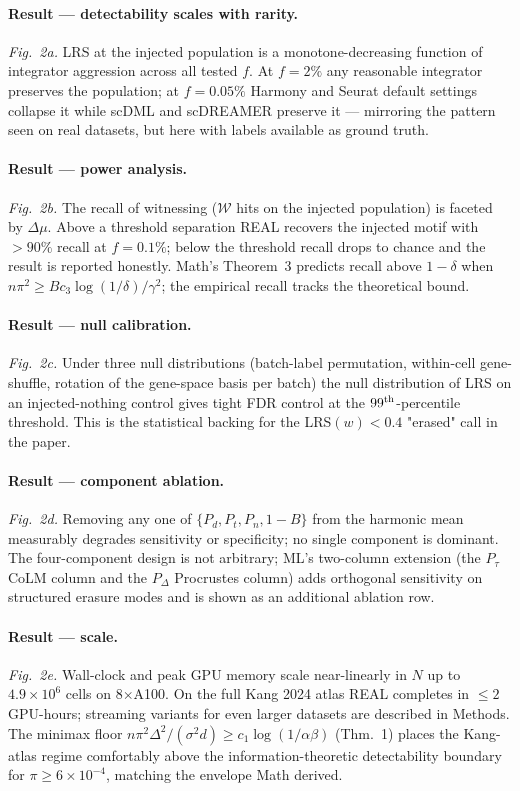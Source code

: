 \paragraph{Result --- detectability scales with rarity.} \emph{Fig.~2a.}  LRS at the injected population is a monotone-decreasing function of integrator aggression across all tested $f$.  At $f=2\%$ any reasonable integrator preserves the population; at $f=0.05\%$ Harmony and Seurat default settings collapse it while scDML and scDREAMER preserve it --- mirroring the pattern seen on real datasets, but here with labels available as ground truth.

\paragraph{Result --- power analysis.} \emph{Fig.~2b.}  The recall of witnessing ($\mathcal{W}$ hits on the injected population) is faceted by $\Delta\mu$.  Above a threshold separation REAL recovers the injected motif with $>90\%$ recall at $f=0.1\%$; below the threshold recall drops to chance and the result is reported honestly.  Math's Theorem~3 predicts recall above $1-\delta$ when $n\pi^2 \ge Bc_3\log(1/\delta)/\gamma^2$; the empirical recall tracks the theoretical bound.

\paragraph{Result --- null calibration.} \emph{Fig.~2c.}  Under three null distributions (batch-label permutation, within-cell gene-shuffle, rotation of the gene-space basis per batch) the null distribution of LRS on an injected-nothing control gives tight FDR control at the $99^{\rm th}$-percentile threshold.  This is the statistical backing for the LRS$(w)<0.4$ "erased" call in the paper.

\paragraph{Result --- component ablation.} \emph{Fig.~2d.}  Removing any one of $\{P_d, P_t, P_n, 1-B\}$ from the harmonic mean measurably degrades sensitivity or specificity; no single component is dominant.  The four-component design is not arbitrary; ML's two-column extension (the $P_\tau$ CoLM column and the $P_\Delta$ Procrustes column) adds orthogonal sensitivity on structured erasure modes and is shown as an additional ablation row.

\paragraph{Result --- scale.} \emph{Fig.~2e.}  Wall-clock and peak GPU memory scale near-linearly in $N$ up to $4.9\times 10^6$ cells on 8$\times$A100.  On the full Kang 2024 atlas REAL completes in $\le 2$ GPU-hours; streaming variants for even larger datasets are described in Methods.  The minimax floor $n\pi^2\Delta^2/(\sigma^2 d)\ge c_1\log(1/\alpha\beta)$ (Thm.~1) places the Kang-atlas regime comfortably above the information-theoretic detectability boundary for $\pi \ge 6\times 10^{-4}$, matching the envelope Math derived.

